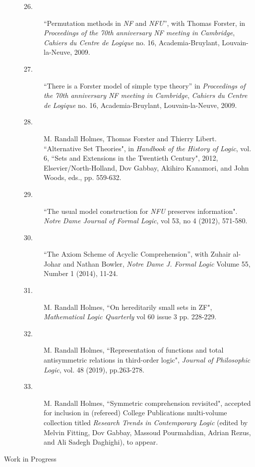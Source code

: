 \begin{description}
\begin{description}
\item[26.] ``Permutation methods in {\em NF\/} and {\em NFU\/}'', with
Thomas Forster, in {\em Proceedings of the 70th anniversary NF meeting
in Cambridge\/}, {\em Cahiers du Centre de Logique\/} no. 16,
Academia-Bruylant, Louvain-la-Neuve, 2009.

\item[27.] ``There is a Forster model of simple type theory'' in {\em
Proceedings of the 70th anniversary NF meeting in Cambridge\/}, {\em
Cahiers du Centre de Logique\/} no. 16, Academia-Bruylant,
Louvain-la-Neuve, 2009.

\item[28.]
M. Randall Holmes, Thomas Forster and Thierry Libert. ``Alternative Set Theories",  in {\em Handbook of the History of Logic\/}, vol. 6, ``Sets and Extensions in the Twentieth Century", 2012, Elsevier/North-Holland, Dov Gabbay, Akihiro Kanamori, and John Woods, eds., pp. 559-632.

\item[29.] ``The usual model construction for {\em NFU\/} preserves information".  {\em Notre Dame Journal of Formal Logic\/}, vol 53, no 4 (2012), 571-580.

\item[30.]  ``The Axiom Scheme of Acyclic Comprehension'', with Zuhair al-Johar and Nathan Bowler, {\em Notre Dame J. Formal Logic\/}
Volume 55, Number 1 (2014), 11-24.

\item[31.]  M. Randall Holmes, ``On hereditarily small sets in ZF", {\em Mathematical Logic Quarterly\/}  vol 60 issue 3 pp. 228-229.

\item[32.]  M. Randall Holmes, ``Representation of functions and total antisymmetric relations in third-order logic", {\em Journal of Philosophic Logic\/}, vol. 48 (2019), pp.263-278.

\item[33.] M. Randall Holmes, ``Symmetric comprehension revisited", accepted for inclusion in (refereed) College Publications multi-volume collection titled {\em Research Trends in Contemporary Logic\/} (edited by Melvin Fitting, Dov Gabbay, Massoud Pourmahdian, Adrian Rezus, and Ali Sadegh Daghighi), to appear.


        \end{description}

\newpage

\item[Work in Progress]


\end{description}

